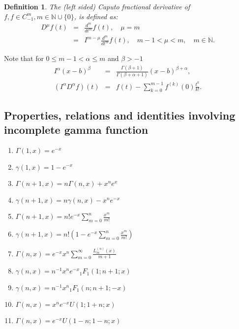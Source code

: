 \documentclass[12pt]{article}
\newtheorem{Def}{Definition}[section]
\numberwithin{equation}{section}
\begin{document}
\begin{Def}
The (left sided) Caputo fractional derivative of $f, f \in C_{-1}^m, m\in\mathbb{N}\cup\{0\}$, is defined as:
\begin{eqnarray}
D^\mu f(t)&=&\frac{d^m}{ dt^m} f(t),\quad \mu = m \nonumber\\
&=& I^{m-\mu}\frac{d^m}{ dt^m} f(t),\quad {m-1} <\mu <m,\quad m\in \mathbb{N}.
\end{eqnarray}
\end{Def}
Note that for $0\le m-1 < \alpha \le m$ and $\beta>-1$
\begin{eqnarray}
I^\alpha (x-b)^\beta &=&\frac{\Gamma{(\beta+1)}}{ \Gamma{(\beta+\alpha+1)}} (x-b)^{\beta+\alpha},\nonumber\\
\left(I^\alpha D^\alpha f\right)(t)&=& f(t)-\sum_{k=0}^{m-1} f^{(k)}(0)\frac{t^k}{k!}.
\end{eqnarray}



\subsection{Properties, relations and identities involving incomplete gamma function}\label{6.1.4}
\begin{enumerate}
\item $\Gamma(1,x) = e^{-x}$\label{6.1.5}
\item $\gamma(1,x) = 1-e^{-x}$\label{6.1.6}
\item $\Gamma(n+1,x) = n \Gamma(n,x)+ x^n e^x$\label{6.1.7}
\item $\gamma(n+1,x) = n \gamma(n,x) - x^n e^{-x}$\label{6.1.8}
\item $\Gamma(n+1,x) = n! e^{-x} \sum_{m=0}^n\frac{x^m}{m!}$\label{6.1.9}
\item $\gamma(n+1,x) = n!\left(1- e^{-x} \sum_{m=0}^n\frac{x^m}{m!}\right)$\label{6.1.10}
\item $\Gamma(n,x) = e^{-x}x^n \sum_{m=0}^\infty \frac{L_{m}^{(n)}(x)}{m+1}$\label{6.1.13}
\item$\gamma(n,x)= n^{-1} x^n e^{-x}{}_1F_{1}(1; n+1; x)$\label{6.1.14}
\item$\gamma(n,x)=n^{-1} x^n {}_1F_{1}(n; n+1; -x)$\label{6.1.15}
\item$\Gamma(n,x) =  x^n e^{-x}U(1; 1+n; x)$\label{6.1.16}
\item$\Gamma(n,x) = e^{-x}U(1-n; 1-n; x)$\label{6.1.17}
\end{enumerate}
 
\end{document}
